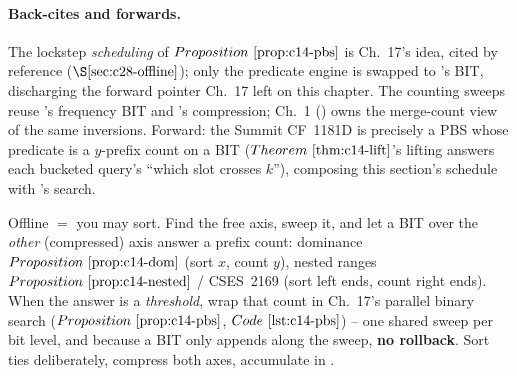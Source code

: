 \paragraph{Back-cites and forwards.}
The lockstep \emph{scheduling} of \(\propref{c14-pbs}\) is Ch.~17's idea, cited
by reference (\(\secref{c28-offline}\)); only the predicate engine is swapped to
's BIT, discharging the forward pointer Ch.~17 left on this
chapter.  The counting sweeps reuse 's frequency BIT and
's compression; Ch.~1 () owns the merge-count
view of the same inversions.  Forward: the Summit CF~1181D is precisely a PBS
whose predicate is a \(y\)-prefix count on a BIT (\(\thmref{c14-lift}\)'s
lifting answers each bucketed query's ``which slot crosses \(k\)''), composing
this section's schedule with 's search.

\begin{recallbox}
Offline \(=\) you may sort.  Find the free axis, sweep it, and let a BIT over
the \emph{other} (compressed) axis answer a prefix count: dominance
\(\propref{c14-dom}\) (sort \(x\), count \(y\)), nested ranges
\(\propref{c14-nested}\) / CSES~2169 (sort left ends, count right ends).  When
the answer is a \emph{threshold}, wrap that count in Ch.~17's parallel binary
search (\(\propref{c14-pbs}\), \(\coderef{c14-pbs}\)) -- one shared sweep per
bit level, and because a BIT only appends along the sweep, \textbf{no rollback}.
Sort ties deliberately, compress both axes, accumulate in .
\end{recallbox}
